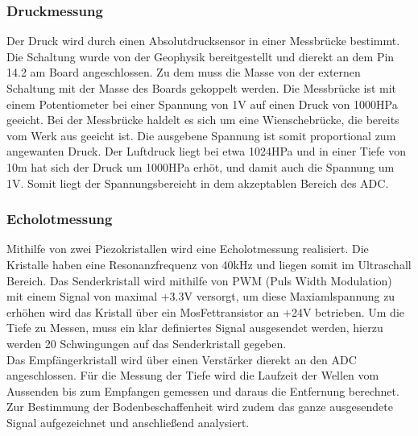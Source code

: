 \documentclass[12pt,a4paper,titlepage,headinclude,bibtotoc]{scrartcl}
\begin{document}
\subsubsection{Druckmessung}
Der Druck wird durch einen Absolutdrucksensor in einer Messbrücke bestimmt.
Die Schaltung wurde von der Geophysik bereitgestellt und dierekt an dem Pin 14.2 am Board angeschlossen.
Zu dem muss die Masse von der externen Schaltung mit der Masse des Boards gekoppelt werden.
Die Messbrücke ist mit einem Potentiometer bei einer Spannung von 1\si{\volt} auf einen Druck von 1000HPa geeicht.
Bei der Messbrücke haldelt es sich um  eine Wienschebrücke, die bereits vom Werk aus geeicht ist.
Die ausgebene Spannung ist somit proportional zum angewanten Druck.
Der Luftdruck liegt bei etwa 1024HPa und in einer Tiefe von 10\si{\meter} hat sich der Druck um 1000HPa erhöt, und damit auch die Spannung um 1\si{\volt}.
Somit liegt der Spannungsbereicht in dem akzeptablen Bereich des ADC.

\subsubsection{Echolotmessung}
Mithilfe von zwei Piezokristallen wird eine Echolotmessung realisiert.
Die Kristalle haben eine Resonanzfrequenz von 40\si{\kilo\hertz} und liegen somit im Ultraschall Bereich.
Das Senderkristall wird mithilfe von PWM (Puls Width Modulation) mit einem Signal von maximal +3.3\si{\volt} versorgt, um diese Maxiamlspannung zu erhöhen wird das Kristall über ein MosFettransistor an +24\si{\volt} betrieben.%
Um die Tiefe zu Messen, muss ein klar definiertes Signal ausgesendet werden, hierzu werden 20 Schwingungen auf das Senderkristall gegeben.\\
Das Empfängerkristall wird über einen Verstärker dierekt an den ADC angeschlossen.
Für die Messung der Tiefe wird die Laufzeit der Wellen vom Aussenden bis zum Empfangen gemessen und daraus die Entfernung berechnet.
Zur Bestimmung der Bodenbeschaffenheit wird zudem das ganze ausgesendete Signal aufgezeichnet und anschließend analysiert.
\end{document}
